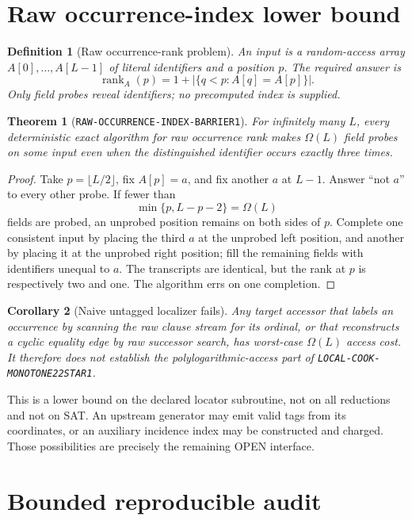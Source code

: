 \documentclass[11pt]{article}
\newtheorem{definition}{Definition}
\newtheorem{theorem}{Theorem}
\newtheorem{corollary}[theorem]{Corollary}
\begin{document}
\section{Raw occurrence-index lower bound}

\begin{definition}[Raw occurrence-rank problem]
An input is a random-access array $A[0],\ldots,A[L-1]$ of literal identifiers
and a position $p$.  The required answer is
\[
 \operatorname{rank}_A(p)=
 1+|\{q<p:A[q]=A[p]\}|.
\]
Only field probes reveal identifiers; no precomputed index is supplied.
\end{definition}

\begin{theorem}[\texttt{RAW-OCCURRENCE-INDEX-BARRIER1}]
For infinitely many $L$, every deterministic exact algorithm for raw
occurrence rank makes $\Omega(L)$ field probes on some input even when the
distinguished identifier occurs exactly three times.
\end{theorem}
\begin{proof}
Take $p=\lfloor L/2\rfloor$, fix $A[p]=a$, and fix another $a$ at $L-1$.
Answer ``not $a$'' to every other probe.  If fewer than
\[
 \min\{p,L-p-2\}=\Omega(L)
\]
fields are probed, an unprobed position remains on both sides of $p$.
Complete one consistent input by placing the third $a$ at the unprobed left
position, and another by placing it at the unprobed right position; fill the
remaining fields with identifiers unequal to $a$.  The transcripts are
identical, but the rank at $p$ is respectively two and one.  The algorithm
errs on one completion.
\end{proof}

\begin{corollary}[Naive untagged localizer fails]
Any target accessor that labels an occurrence by scanning the raw clause
stream for its ordinal, or that reconstructs a cyclic equality edge by raw
successor search, has worst-case $\Omega(L)$ access cost.  It therefore does
not establish the polylogarithmic-access part of
\texttt{LOCAL-COOK-MONOTONE22STAR1}.
\end{corollary}

This is a lower bound on the declared locator subroutine, not on all
reductions and not on SAT.  An upstream generator may emit valid tags from
its coordinates, or an auxiliary incidence index may be constructed and
charged.  Those possibilities are precisely the remaining OPEN interface.

\section{Bounded reproducible audit}
\end{document}
